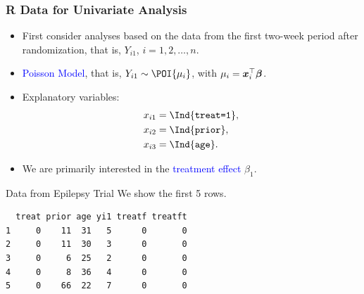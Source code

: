\documentclass[oneside]{book}\usepackage[]{graphicx}\usepackage[svgnames]{xcolor}
\makeatletter
\newenvironment{kframe}{%
 \def\at@end@of@kframe{}%
 \ifinner\ifhmode%
  \def\at@end@of@kframe{\end{minipage}}%
  \begin{minipage}{\columnwidth}%
 \fi\fi%
 \def\FrameCommand##1{\hskip\@totalleftmargin \hskip-\fboxsep
 \colorbox{shadecolor}{##1}\hskip-\fboxsep
     \hskip-\linewidth \hskip-\@totalleftmargin \hskip\columnwidth}%
 \MakeFramed {\advance\hsize-\width
   \@totalleftmargin\z@ \linewidth\hsize
   \@setminipage}}%
 {\par\unskip\endMakeFramed%
 \at@end@of@kframe}
\newenvironment{knitrout}{}{} %
\let\log\relax%
\providecommand{\Vector}[1]{\bm{#1}}%
\makeatother
\begin{document}
\subsubsection*{R Data for Univariate Analysis}
\begin{itemize}
    \item First consider analyses based on the data from the first two-week period after
          randomization, that is, $ Y_{i1} $, $ i=1,2,\ldots,n $.
    \item \textcolor{Blue}{Poisson Model}, that is, $ Y_{i1}\sim \POI{\mu_i} $, with $ \log{\mu_i}=\Vector{x}_i^\top \Vector{\beta} $.
    \item Explanatory variables:
          \begin{align*}
              x_{i1} & =\Ind{\texttt{treat=1}}, \\
              x_{i2} & =\Ind{\texttt{prior}},   \\
              x_{i3} & =\Ind{\texttt{age}}.
          \end{align*}
    \item We are primarily interested in the \textcolor{Blue}{treatment effect} $ \beta_1 $.
\end{itemize}
\begin{Example}{Data from Epilepsy Trial}
    We show the first 5 rows.
\begin{knitrout}
\color{fgcolor}\begin{kframe}
\begin{verbatim}
  treat prior age yi1 treatf treatft
1     0    11  31   5      0       0
2     0    11  30   3      0       0
3     0     6  25   2      0       0
4     0     8  36   4      0       0
5     0    66  22   7      0       0
\end{verbatim}
\end{kframe}
\end{knitrout}
\end{Example}
\end{document}
